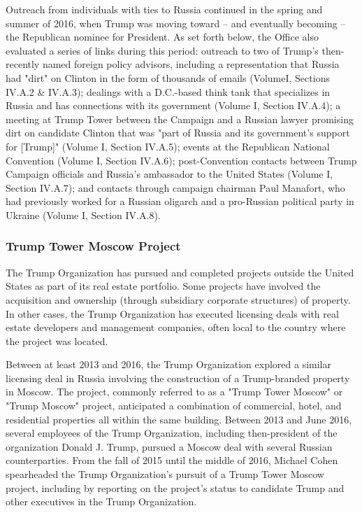 Outreach from individuals with ties to Russia continued in the spring and summer of 2016, when Trump was moving toward -- and eventually becoming -- the Republican nominee for President.
As set forth below, the Office also evaluated a series of links during this period: outreach to two of Trump's then-recently named foreign policy advisors, including a representation that Russia had "dirt" on Clinton in the form of thousands of emails (VolumeI, Sections IV.A.2 \& IV.A.3); dealings with a D.C.-based think tank that specializes in Russia and has connections with its government (Volume I, Section IV.A.4); a meeting at Trump Tower between the Campaign and a Russian lawyer promising dirt on candidate Clinton that was "part of Russia and its government's support for [Trump]" (Volume I, Section IV.A.5); events at the Republican National Convention (Volume I, Section IV.A.6); post-Convention contacts between Trump Campaign officials and Russia's ambassador to the United States (Volume I, Section IV.A.7); and contacts through campaign chairman Paul Manafort, who had previously worked for a Russian oligarch and a pro-Russian political party in Ukraine (Volume I, Section IV.A.8).

\subsubsection{Trump Tower Moscow Project}

The Trump Organization has pursued and completed projects outside the United States as part of its real estate portfolio.
Some projects have involved the acquisition and ownership (through subsidiary corporate structures) of property.
In other cases, the Trump Organization has executed licensing deals with real estate developers and management companies, often local to the country where the project was located.

Between at least 2013 and 2016, the Trump Organization explored a  similar licensing deal in Russia involving the construction of a Trump-branded property in Moscow.
The project, commonly referred to as a "Trump Tower Moscow" or "Trump Moscow" project,  anticipated a combination of commercial, hotel, and residential properties all within the same building.
Between 2013 and June 2016, several employees of the Trump Organization, including then-president of the organization Donald J. Trump, pursued a  Moscow deal with several Russian counterparties.
From the fall of 2015 until the middle of 2016, Michael Cohen spearheaded the Trump Organization's pursuit of a  Trump Tower Moscow project, including by reporting on the project's status to candidate Trump and other executives in the Trump Organization.

